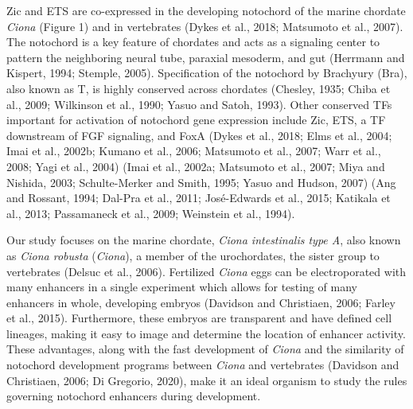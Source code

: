 Zic and ETS are co-expressed in the developing notochord of the marine chordate \textit{Ciona} (Figure 1) and in vertebrates (Dykes et al., 2018; Matsumoto et al., 2007). The notochord is a key feature of chordates and acts as a signaling center to pattern the neighboring neural tube, paraxial mesoderm, and gut (Herrmann and Kispert, 1994; Stemple, 2005). Specification of the notochord by Brachyury (Bra), also known as T, is highly conserved across chordates (Chesley, 1935; Chiba et al., 2009; Wilkinson et al., 1990; Yasuo and Satoh, 1993). Other conserved TFs important for activation of notochord gene expression include Zic, ETS,  a TF downstream of FGF signaling, and FoxA (Dykes et al., 2018; Elms et al., 2004; Imai et al., 2002b; Kumano et al., 2006; Matsumoto et al., 2007; Warr et al., 2008; Yagi et al., 2004) (Imai et al., 2002a; Matsumoto et al., 2007; Miya and Nishida, 2003; Schulte-Merker and Smith, 1995; Yasuo and Hudson, 2007) (Ang and Rossant, 1994; Dal-Pra et al., 2011; José-Edwards et al., 2015; Katikala et al., 2013; Passamaneck et al., 2009; Weinstein et al., 1994). 

Our study focuses on the marine chordate, \textit{\textit{Ciona} intestinalis type A},  also known as \textit{\textit{Ciona} robusta} (\textit{Ciona}), a member of the urochordates, the sister group to vertebrates (Delsuc et al., 2006). Fertilized \textit{Ciona} eggs can be electroporated with many enhancers in a single experiment which allows for testing of many enhancers in whole, developing embryos (Davidson and Christiaen, 2006; Farley et al., 2015). Furthermore, these embryos are transparent and have defined cell lineages, making it easy to image and determine the location of enhancer activity. These advantages, along with the fast development of \textit{Ciona} and the similarity of notochord development programs between \textit{Ciona} and vertebrates (Davidson and Christiaen, 2006; Di Gregorio, 2020), make it an ideal organism to study the rules governing notochord enhancers during development. 

